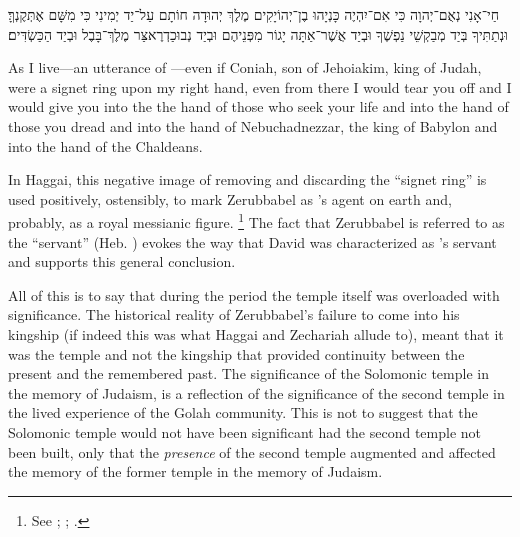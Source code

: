 \begin{hebrewtext}
    חַי־אָנִי נְאֻם־יְהוָה כִּי אִם־יִהְיֶה כָּנְיָהוּ בֶן־יְהוֹיָקִים מֶלֶךְ יְהוּדָה חוֹתָם עַל־יַד יְמִינִי כִּי מִשָּׁם אֶתְּקֶנְךָּ׃ 
    וּנְתַתִּיךָ בְּיַד מְבַקְשֵׁי נַפְשֶׁךָ וּבְיַד אֲשֶׁר־אַתָּה יָגוֹר מִפְּנֵיהֶם וּבְיַד נְבוּכַדְרֶאצַּר מֶלֶךְ־בָּבֶל וּבְיַד הַכַּשְׂדִּים׃
\end{hebrewtext}
\begin{translation}
    As I live---an utterance of \yahweh---even if Coniah, son of Jehoiakim, king of Judah, were a signet ring upon my right hand, even from there I would tear you off
    and I would give you into the the hand of those who seek your life and into the hand of those you dread and into the hand of Nebuchadnezzar, the king of Babylon and into the hand of the Chaldeans.
\end{translation}
\noindent
In Haggai, this negative image of \yahweh removing and discarding the ``signet ring'' is used positively, ostensibly, to mark Zerubbabel as \yahweh's agent on earth and, probably, as a royal messianic figure.%
    \footnote{See
        \cite[71--103]{blenkinsopp2013};
        \cite[2:281--284]{vonrad1962};
        \cite[187]{redditt_interpretation2007}.}
The fact that Zerubbabel is referred to as the ``servant'' (Heb. ) evokes the way that David was characterized as \yahweh's servant and supports this general conclusion.

All of this is to say that during the \secondtemple period the temple itself was overloaded with significance. The historical reality of Zerubbabel's failure to come into his kingship (if  indeed this was what Haggai and Zechariah allude to), meant that it was the temple and not the kingship that provided continuity between the present and the remembered past. The significance of the Solomonic temple in the memory of \secondtemple Judaism, is a reflection of the significance of the second temple in the lived experience of the Golah community. This is not to suggest that the Solomonic temple would not have been significant had the second temple not been built, only that the \emph{presence} of the second temple augmented and affected the memory of the former temple in the memory of \secondtemple Judaism.
